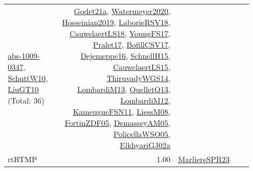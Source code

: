 {\begin{longtable}{p{3cm}r>{\raggedright\arraybackslash}p{6cm}>{\raggedright\arraybackslash}p{6cm}>{\raggedright\arraybackslash}p{8cm}}
\hyperref[detail:abs-1009-0347]{abs-1009-0347}, \hyperref[detail:SchuttW10]{SchuttW10}, \hyperref[detail:LiuGT10]{LiuGT10} (Total: 36) & \hyperref[detail:Godet21a]{Godet21a}, \hyperref[detail:Watermeyer2020]{Watermeyer2020}, \hyperref[detail:Hosseinian2019]{Hosseinian2019}, \hyperref[detail:LaborieRSV18]{LaborieRSV18}, \hyperref[detail:CauwelaertLS18]{CauwelaertLS18}, \hyperref[detail:YoungFS17]{YoungFS17}, \hyperref[detail:Pralet17]{Pralet17}, \hyperref[detail:BofillCSV17]{BofillCSV17}, \hyperref[detail:Dejemeppe16]{Dejemeppe16}, \hyperref[detail:SchnellH15]{SchnellH15}, \hyperref[detail:CauwelaertLS15]{CauwelaertLS15}, \hyperref[detail:ThiruvadyWGS14]{ThiruvadyWGS14}, \hyperref[detail:LombardiM13]{LombardiM13}, \hyperref[detail:OuelletQ13]{OuelletQ13}, \hyperref[detail:LombardiM12]{LombardiM12}, \hyperref[detail:KameugneFSN11]{KameugneFSN11}, \hyperref[detail:LiessM08]{LiessM08}, \hyperref[detail:FortinZDF05]{FortinZDF05}, \hyperref[detail:DemasseyAM05]{DemasseyAM05}, \hyperref[detail:PolicellaWSO05]{PolicellaWSO05}, \hyperref[detail:ElkhyariGJ02a]{ElkhyariGJ02a}\\
\index{rtRTMP}\index{Classification!rtRTMP}rtRTMP &  1.00 & \hyperref[detail:MarliereSPR23]{MarliereSPR23} &  & \\

\end{longtable}}
